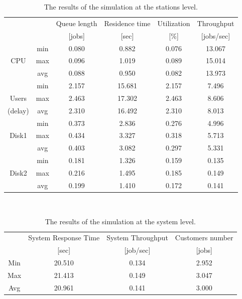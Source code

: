 \begin{table}
\begin{center}
  \begin{tabular}{|c|c||c|c|c|c|}
\hline
  &&Queue length&Residence time&Utilization  &Throughput \\
    &&[jobs]&[sec]&[\%]  &[jobs/sec] \\ \hline
         &min  &0.080  &0.882&0.076&13.067  \\
     CPU &max  &0.096  &1.019&0.089&15.014  \\
         &avg  &0.088  &0.950&0.082&13.973  \\ \hline
         &min  &2.157  &15.681&2.157&7.496  \\
   Users &max  &2.463  &17.302&2.463&8.606  \\
   (delay)&avg  &2.310  &16.492&2.310&8.013  \\ \hline
         &min  &0.373  &2.836&0.276&4.996  \\
    Disk1&max  &0.434  &3.327&0.318&5.713  \\
             &avg  &0.403  &3.082&0.297&5.331  \\ \hline
         &min  &0.181  &1.326&0.159&0.135  \\
    Disk2&max  &0.216  &1.495&0.185&0.149  \\
         &avg  &0.199  &1.410&0.172&0.141  \\ \hline
      \end{tabular}\\
\end{center}
 \caption{The results of the simulation at the stations level.}
 \label{fig:ressm1}
\end{table}

\begin{table}
\begin{center}
  \begin{tabular}{|c||c|c|c|}
\hline
  &System Response Time &System Throughput&Customers number \\
    &[sec]&[job/sec]&[jobs]  \\ \hline
     Min    &20.510  &0.134 & 2.952 \\ \hline
   Max &21.413 &0.149  &3.047  \\ \hline
        Avg &20.961 &0.141  &3.000  \\ \hline
      \end{tabular}\\
\end{center}
 \caption{The results of the simulation at the system level.}
 \label{fig:globres}
\end{table}

